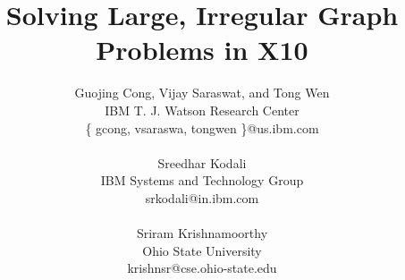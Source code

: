 \documentclass[10pt]{article}
\numberwithin{equation}{section}
\def\Xten{{\sf X10}}
\begin{document}
\title{Solving Large, Irregular Graph Problems in \Xten}

\author{
Guojing Cong,  Vijay Saraswat, and Tong Wen\\
IBM T. J. Watson Research Center\\
 \{ gcong, vsaraswa, tongwen \}@us.ibm.com\\ 
\vspace*{-2ex} \\
Sreedhar Kodali\\
IBM Systems and Technology Group\\
srkodali@in.ibm.com\\
\vspace*{-2ex} \\
Sriram Krishnamoorthy \\
Ohio State University\\
krishnsr@cse.ohio-state.edu
\vspace*{-3ex} \\
}

\date{}

\maketitle
\thispagestyle{empty}






%



{\footnotesize


}
\end{document}
